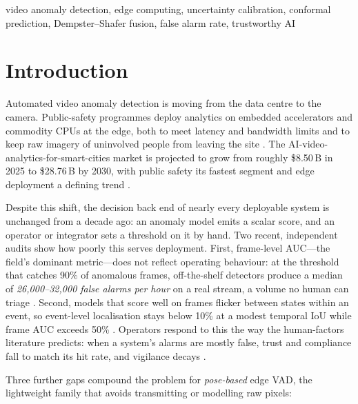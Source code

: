 \documentclass[conference]{IEEEtran}
\begin{document}
\begin{IEEEkeywords}
video anomaly detection, edge computing, uncertainty calibration, conformal
prediction, Dempster--Shafer fusion, false alarm rate, trustworthy AI
\end{IEEEkeywords}

\section{Introduction}
\label{sec:intro}

Automated video anomaly detection is moving from the data centre to the
camera. Public-safety programmes deploy analytics on embedded accelerators
and commodity CPUs at the edge, both to meet latency and bandwidth limits and
to keep raw imagery of uninvolved people from leaving the site
\cite{edgevadsurvey2026,privacyvadsurvey2024}. The AI-video-analytics-for-smart-cities
market is projected to grow from roughly \$8.50\,B in 2025 to \$28.76\,B by 2030,
with public safety its fastest segment and edge deployment a defining trend
\cite{marketaivideo2025}.

Despite this shift, the decision back end of nearly every deployable system is
unchanged from a decade ago: an anomaly model emits a scalar score, and an
operator or integrator sets a threshold on it by hand. Two recent, independent
audits show how poorly this serves deployment. First, frame-level AUC---the
field's dominant metric---does not reflect operating behaviour: at the
threshold that catches 90\% of anomalous frames, off-the-shelf
detectors produce a median of \emph{26{,}000--32{,}000 false alarms per hour}
on a real stream, a volume no human can triage \cite{benchmarkauc2026}.
Second, models that score well on frames flicker between states within an
event, so event-level localisation stays below 10\% at a modest
temporal IoU while frame AUC exceeds 50\% \cite{framestoevents2026}.
Operators respond to this the way the human-factors literature predicts: when
a system's alarms are mostly false, trust and compliance fall to match its
hit rate, and vigilance decays \cite{alertfatigue2025,cctvsemiauto2012,
cctvvigilance2014}.

Three further gaps compound the problem for \emph{pose-based} edge VAD, the
lightweight family that avoids transmitting or modelling raw pixels:
\end{document}

